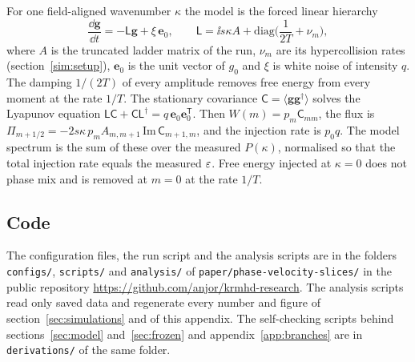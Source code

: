 For one field-aligned wavenumber $\kappa$ the model is the forced linear hierarchy
\begin{equation}\label{appD:linear}
  \frac{\dd\boldsymbol g}{\dd t}=-\mathsf L\boldsymbol g+\xi\,\boldsymbol e_0,\qquad
  \mathsf L=\ii s\kappa A+\mathrm{diag}\Big(\frac{1}{2T}+\nu_m\Big),
\end{equation}
where $A$ is the truncated ladder matrix of the run, $\nu_m$ are its hypercollision rates (section~\ref{sim:setup}), $\boldsymbol e_0$ is the unit vector of $g_0$ and $\xi$ is white noise of intensity $q$. The damping $1/(2T)$ of every amplitude removes free energy from every moment at the rate $1/T$. The stationary covariance $\mathsf C=\langle\boldsymbol g\boldsymbol g^\dagger\rangle$ solves the Lyapunov equation $\mathsf L\mathsf C+\mathsf C\mathsf L^\dagger=q\,\boldsymbol e_0\boldsymbol e_0^{\mathsf T}$. Then $W(m)=p_m\mathsf C_{mm}$, the flux is $\Pi_{m+1/2}=-2s\kappa\,p_mA_{m,m+1}\,\mathrm{Im}\,\mathsf C_{m+1,m}$, and the injection rate is $p_0q$. The model spectrum is the sum of these over the measured $P(\kappa)$, normalised so that the total injection rate equals the measured $\varepsilon$. Free energy injected at $\kappa=0$ does not phase mix and is removed at $m=0$ at the rate $1/T$.

\subsection{Code}

The configuration files, the run script and the analysis scripts are in the folders \texttt{configs/}, \texttt{scripts/} and \texttt{analysis/} of \texttt{paper/phase-velocity-slices/} in the public repository \url{https://github.com/anjor/krmhd-research}. The analysis scripts read only saved data and regenerate every number and figure of section~\ref{sec:simulations} and of this appendix. The self-checking scripts behind sections~\ref{sec:model} and~\ref{sec:frozen} and appendix~\ref{app:branches} are in \texttt{derivations/} of the same folder.
